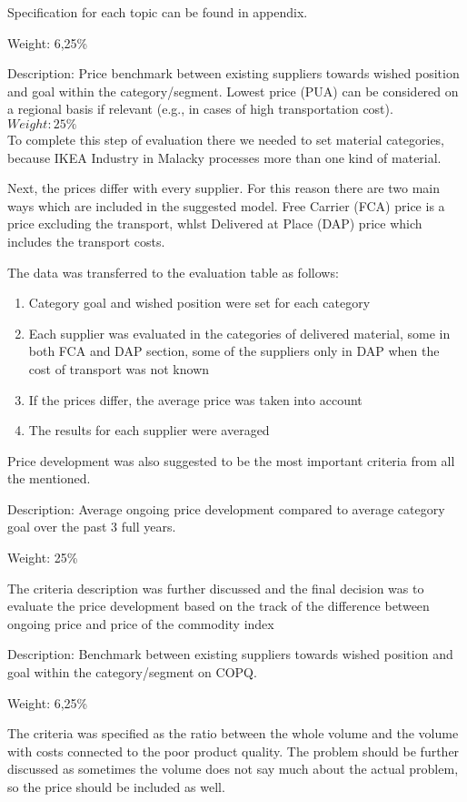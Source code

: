 \documentclass[oneside,12pt]{article}%
\begin{document}
Specification for each topic can be found in appendix. \par
Weight: 6,25\%



Description: Price benchmark between existing suppliers towards wished position and goal within the category/segment. Lowest price (PUA) can be considered on a regional basis if relevant (e.g., in cases of high transportation cost).
\\
$ Weight: 25\% $
\\
To complete this step of evaluation there we needed to set material categories, because IKEA Industry in Malacky processes more than one kind of material. \par
Next, the prices differ with every supplier. For this reason there are two main ways which are included in the suggested model. Free Carrier (FCA) price is a price excluding the transport, whlst Delivered at Place (DAP) price which includes the transport costs. \par
The data was transferred to the evaluation table as follows:

\begin{enumerate}
  \item Category goal and wished position were set for each category
  \item Each supplier was evaluated in the categories of delivered material, some in both FCA and DAP section, some of the suppliers only in DAP when the cost of transport was not known
  \item If the prices differ, the average price was taken into account
  \item The results for each supplier were averaged
\end{enumerate}

Price development was also suggested to be the most important criteria from all the mentioned.


Description: Average ongoing price development compared to average category goal over the past 3 full years. \par
Weight: 25\% \par
The criteria description was further discussed and the final decision was to evaluate the price development based on the track of the difference between ongoing price and price of the commodity index


Description: Benchmark between existing suppliers towards wished position and goal within the category/segment on COPQ.\par
Weight: 6,25\% \par
The criteria was specified as the ratio between the whole volume and the volume with costs connected to the poor product quality. The problem should be further discussed as sometimes the volume does not say much about the actual problem, so the price should be included as well.
\end{document}
